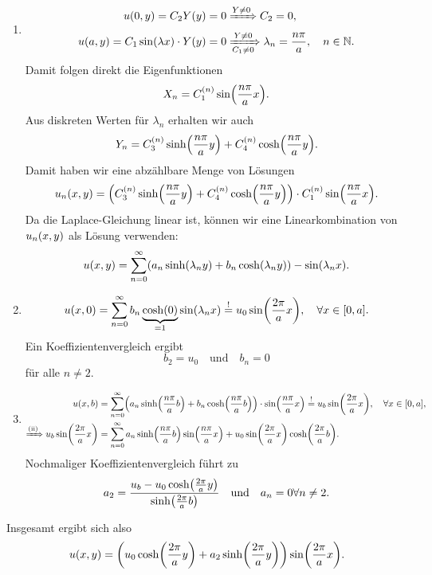 \documentclass{exercise}
\begin{document}
    \begin{enumerate}[label=(\roman*)]
        \item 
        \begin{align*}
            u\parentheses*{0, y} = C_2 Y\parentheses*{y} = 0 &\xRightarrow{Y \ne 0} C_2 = 0,\\
            u\parentheses*{a, y} = C_1\sin\parentheses*{\lambda x} \cdot Y\parentheses*{y} = 0 &\xRightarrow[C_1 \ne 0]{Y \ne 0} \lambda_n = \frac{n\pi}{a}, \quad n \in \N.
        \end{align*}
        Damit folgen direkt die Eigenfunktionen
        \[
            X_n = C_1^{\parentheses*{n}}\sin\parentheses*{\frac{n\pi}{a}x}.
        \]
        Aus diskreten Werten für \(\lambda_n\) erhalten wir auch
        \[
            Y_n = C_3^{\parentheses*{n}}\sinh\parentheses*{\frac{n\pi}{a}y} + C_4^{\parentheses*{n}}\cosh\parentheses*{\frac{n\pi}{a}y}.
        \]
        Damit haben wir eine abzählbare Menge von Lösungen
        \[
            u_n\parentheses*{x, y} = \parentheses*{C_3^{\parentheses*{n}}\sinh\parentheses*{\frac{n\pi}{a}y} + C_4^{\parentheses*{n}}\cosh\parentheses*{\frac{n\pi}{a}y}} \cdot C_1^{\parentheses*{n}}\sin\parentheses*{\frac{n\pi}{a}x}.
        \]
        Da die Laplace-Gleichung linear ist, können wir eine Linearkombination von \(u_n\parentheses*{x, y}\) als Lösung verwenden:
        \[
            u\parentheses*{x, y} = \sum_{n = 0}^\infty\parentheses*{a_n\sinh\parentheses*{\lambda_n y} + b_n\cosh\parentheses*{\lambda_n y}} - \sin\parentheses*{\lambda_n x}.
        \]
        \item
        \[
            u\parentheses*{x, 0} = \sum_{n = 0}^\infty b_n\underbrace{\cosh\parentheses*{0}}_{= 1}\sin\parentheses*{\lambda_n x} \stackrel{!}{=} u_0\sin\parentheses*{\frac{2\pi}{a}x}, \quad \forall x \in \brackets*{0, a}.
        \]
        Ein Koeffizientenvergleich ergibt
        \[
            b_2 = u_0 \quad \text{und} \quad b_n = 0
        \]
        für alle \(n \ne 2\).
        \item
        \begin{align*}
            u\parentheses*{x, b} &= \sum_{n = 0}^\infty\parentheses*{a_n\sinh\parentheses*{\frac{n\pi}{a}b} + b_n\cosh\parentheses*{\frac{n\pi}{a}b}} \cdot \sin\parentheses*{\frac{n\pi}{a}x} \stackrel{!}{=} u_b\sin\parentheses*{\frac{2\pi}{a}x}, \quad \forall x \in \brackets*{0, a},\\
            \xRightarrow{\text{(ii)}} u_b\sin\parentheses*{\frac{2\pi}{a}x} &= \sum_{n = 0}^\infty a_n\sinh\parentheses*{\frac{n\pi}{a}b}\sin\parentheses*{\frac{n\pi}{a}x} + u_0\sin\parentheses*{\frac{2\pi}{a}x}\cosh\parentheses*{\frac{2\pi}{a}b}.
        \end{align*}
        Nochmaliger Koeffizientenvergleich führt zu
        \[
            a_2 = \frac{u_b - u_0\cosh\parentheses*{\frac{2\pi}{a}y}}{\sinh\parentheses*{\frac{2\pi}{a}b}} \quad \text{und} \quad a_n = 0 \forall n \ne 2.
        \]
    \end{enumerate}
    Insgesamt ergibt sich also
    \[
        u\parentheses*{x, y} = \parentheses*{u_0\cosh\parentheses*{\frac{2\pi}{a}y} + a_2\sinh\parentheses*{\frac{2\pi}{a}y}}\sin\parentheses*{\frac{2\pi}{a}x}.
    \]
\end{document}
